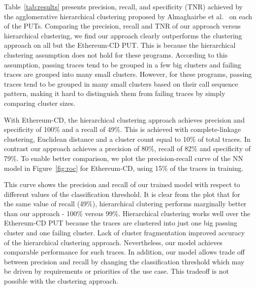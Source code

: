 Table~\ref{tab:results} presents precision, recall, and specificity (TNR) achieved by the agglomerative hierarchical clustering proposed by Almaghairbe et al.~\cite{almaghairbe2017separating} on each of the PUTs. Comparing the precision, recall and TNR of our approach versus hierarchical clustering, we find our approach clearly outperforms the clustering approach on all but the Ethereum-CD PUT. This is because the hierarchical clustering assumption does not hold for these programs. According to this assumption, passing traces tend to be grouped in a few big clusters and failing traces are grouped into many small clusters. However, for these programs, passing traces tend to be grouped in many small clusters based on their call sequence pattern, making it hard to distinguish them from failing traces by simply comparing cluster sizes. 


With Ethereum-CD, the hierarchical clustering approach achieves precision and specificity of 100\% and a recall of 49\%. This is achieved with complete-linkage clustering, Euclidean distance and a cluster count equal to 10\% of total traces. In contrast our approach achieves a precision of 80\%, recall of 82\% and specificity of 79\%. To enable better comparison, we plot the precision-recall curve of the NN model in Figure~\ref{fig:roc} for Ethereum-CD, using 15\% of the traces in training. %

This curve shows the precision and recall of our trained model with respect to different values of the classification threshold.  It is clear from the plot that for the same value of recall (49\%), hierarchical clutering performs marginally better than our approach - 100\% versus 99\%. Hierarchical clustering works well over the Ethereum-CD PUT because the traces are clustered into just one big passing cluster and one failing cluster. Lack of cluster fragmentation improved accuracy of the hierarchical clustering approach. Nevertheless, our model achieves comparable performance for such traces. In addition, our model allows trade off between precision and recall by changing the classification threshold which may be driven by requirements or priorities of the use case. This tradeoff is not possible with the clustering approach. 


